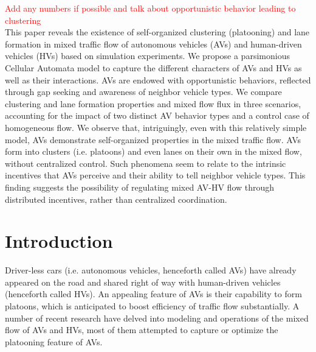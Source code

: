 \documentclass[oneside,letter,11pt]{article}
\begin{document}
\textcolor{red}{Add any numbers if possible and talk about opportunistic behavior leading to clustering\\}
This paper reveals the existence of self-organized clustering (platooning) and lane formation in mixed traffic flow of autonomous vehicles (AVs) and human-driven vehicles (HVs) based on simulation experiments. We propose a parsimonious Cellular Automata model to capture the different characters of AVs and HVs as well as their interactions. AVs are endowed with opportunistic behaviors, reflected through gap seeking and awareness of neighbor vehicle types. We compare clustering and lane formation properties and mixed flow flux in three scenarios, accounting for the impact of two distinct AV behavior types and a control case of homogeneous flow. We observe that, intriguingly, even with this relatively simple model, AVs demonstrate self-organized properties in the mixed traffic flow. AVs form into clusters (i.e. platoons) and even lanes on their own in the mixed flow, without centralized control. Such phenomena seem to relate to the intrinsic incentives that AVs perceive and their ability to tell neighbor vehicle types. This finding suggests the possibility of regulating mixed AV-HV flow through distributed incentives, rather than centralized coordination.


\newpage


\thispagestyle{empty}

\section{Introduction}\label{S:1}


Driver-less cars (i.e. autonomous vehicles, henceforth called AVs) have already appeared on the road and shared right of way with human-driven vehicles (henceforth called HVs). An appealing feature of AVs is their capability to form platoons, which is anticipated to boost efficiency of traffic flow substantially. A number of recent research have delved into modeling and operations of the mixed flow of AVs and HVs, most of them attempted to capture or optimize the platooning feature of AVs. 
\end{document}
